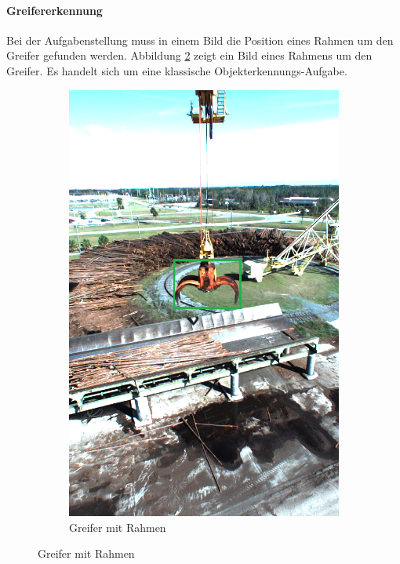 	\paragraph{Greifererkennung} Bei der Aufgabenstellung muss in einem Bild die Position eines Rahmen um den Greifer gefunden werden. Abbildung \ref{img:Grapple} zeigt ein Bild eines Rahmens um den Greifer. Es handelt sich um eine klassische Objekterkennungs-Aufgabe.
	\begin{figure}[h]
		\centering
		\begin{subfigure}[c]{0.49\textwidth}			
			\includegraphics[width=1\textwidth, center]{bilder/Grundlagen/Grapple2.png}
			\caption[Bsp. Bild: Greifer mit Rahmen]{Greifer mit Rahmen}
			\label{img:Grapple}	

\end{subfigure}
\end{figure}
